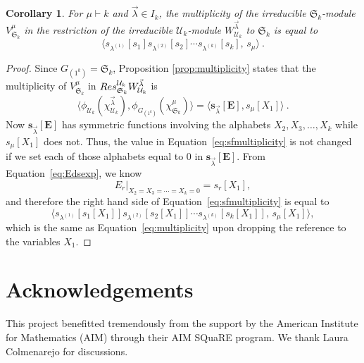 \documentclass[10pt]{amsart}
\newtheorem{cor}[theorem]{Corollary}
\theoremstyle{definition}
\theoremstyle{remark}
\newcommand{\EEE}{\mathbf{E}}
\newcommand{\longthanks}[1]{\section*{Acknowledgements}#1}
\begin{document}
\begin{cor}\label{cor:plethmult}
For $\mu \vdash k$ and $\vec{\lambda} \in I_k$,
the multiplicity of the irreducible $\mathfrak{S}_k$-module
$V^\mu_{\mathfrak{S}_k}$ in the restriction of
the irreducible $\mathcal{U}_k$-module $W^{\vec{\lambda}}_{\mathcal{U}_k}$
to $\mathfrak{S}_k$ is equal to
\begin{equation}\label{eq:multiplicity}
\big\langle s_{\lambda^{(1)}}[s_1]s_{\lambda^{(2)}}[s_2]
\cdots s_{\lambda^{(k)}}[s_k], \, s_\mu \big\rangle~.
\end{equation}
\end{cor}
\begin{proof}
Since $G_{(1^k)} = \mathfrak{S}_k$,
Proposition \ref{prop:multiplicity} states that the multiplicity of
$V^{\mu}_{\mathfrak{S}_k}$ in
${\rm Res}^{\mathcal{U}_k}_{\mathfrak{S}_k} W^{\vec{\lambda}}_{\mathcal{U}_k}$ is
\begin{equation}\label{eq:sfmultiplicity}
\Big\langle \phi_{\mathcal{U}_k}(\chi^{\vec{\lambda}}_{\mathcal{U}_k}),
\phi_{G_{(1^k)}}(\chi^{\mu}_{\mathfrak{S}_k}) \Big\rangle =
\Big\langle \mathbf{s}_{\vec{\lambda}}[\EEE], s_{\mu}[X_1] \Big\rangle~.
\end{equation}
Now $\mathbf{s}_{\vec{\lambda}}[\EEE]$ has symmetric functions involving
the alphabets $X_2, X_3, \ldots, X_k$ while $s_{\mu}[X_1]$ does
not.  Thus, the value in Equation~\eqref{eq:sfmultiplicity} is not changed if we set each of those alphabets
equal to $0$ in $\mathbf{s}_{\vec{\lambda}}[\EEE]$.
From Equation~\eqref{eq:Edsexp}, we know
\[
E_r|_{X_2=X_3= \cdots =X_k=0} = s_r[X_1],
\]
and therefore the right hand side of Equation~\eqref{eq:sfmultiplicity} is equal to
\[
\big\langle s_{\lambda^{(1)}}[s_1[X_1]]
s_{\lambda^{(2)}}[s_2[X_1]]
\cdots
s_{\lambda^{(k)}}[s_k[X_1]], \, s_{\mu}[X_1] \big\rangle,
\]
which is the same as Equation~\eqref{eq:multiplicity}
upon dropping the reference to the variables $X_1$.
\end{proof}




\longthanks{This project benefitted tremendously from the support by the American Institute for Mathematics (AIM) through their AIM SQuaRE program.
We thank Laura Colmenarejo for discussions.}
\end{document}
